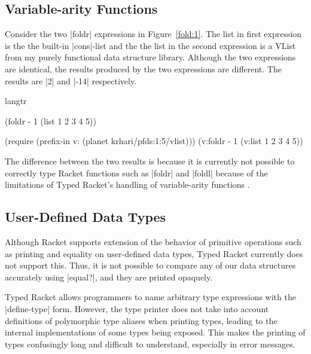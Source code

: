 \subsection*{Variable-arity Functions}

Consider the two \scheme|foldr| expressions in Figure~\ref{fold:1}. The
list in first expression is the the built-in \scheme|cons|-list and the
the list in the second expression is a VList from my purely functional
data structure library. Although the two expressions are identical, the
results produced by the two expressions are different. The results are
\scheme|2| and \scheme|-14| respectively.

\begin{figure*}
\begin{plain}
\begin{schemedisplay}
  langtr
  
  (foldr - 1 (list 1 2 3 4 5))

  (require (prefix-in v: (planet krhari/pfds:1:5/vlist)))
  (v:foldr - 1 (v:list 1 2 3 4 5))
\end{schemedisplay}
\end{plain}
\caption{Variable-arity Functions}
\label{fold:1}
\end{figure*}

The difference between the two results is because it is currently not
possible to correctly type Racket functions such as \scheme|foldr| and
\scheme|foldl| because of the limitations of Typed Racket's handling of
variable-arity functions \citep{stf-esop}.


\subsection*{User-Defined Data Types}
Although Racket supports extension of the behavior of primitive
operations such as printing and equality on user-defined data types,
Typed Racket currently does not support this. Thus, it is not possible
to compare any of our data structures accurately using \scheme|equal?|,
and they are printed opaquely.

Typed Racket allows programmers to name arbitrary type expressions with
the \scheme|define-type| form.  However, the type printer does not take
into account definitions of polymorphic type aliases when printing
types, leading to the internal implementations of some types being
exposed. This makes the printing of types confusingly long and difficult
to understand, especially in error messages.

